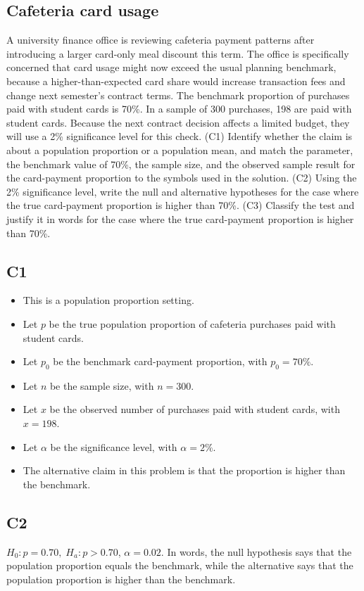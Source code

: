 \begin{ExamProblems}
		\section{Cafeteria card usage}
		A university finance office is reviewing cafeteria payment patterns after introducing a larger card-only meal discount this term. The office is specifically concerned that card usage might now exceed the usual planning benchmark, because a higher-than-expected card share would increase transaction fees and change next semester's contract terms. The benchmark proportion of purchases paid with student cards is 70\%. In a sample of 300 purchases, 198 are paid with student cards. Because the next contract decision affects a limited budget, they will use a 2\% significance level for this check. (C1) Identify whether the claim is about a population proportion or a population mean, and match the parameter, the benchmark value of 70\%, the sample size, and the observed sample result for the card-payment proportion to the symbols used in the solution. (C2) Using the 2\% significance level, write the null and alternative hypotheses for the case where the true card-payment proportion is higher than 70\%. (C3) Classify the test and justify it in words for the case where the true card-payment proportion is higher than 70\%.
		
		\subsection*{C1}
		\begin{itemize}
			\item This is a population proportion setting.
			\item Let \(p\) be the true population proportion of cafeteria purchases paid with student cards.
			\item Let \(p_0\) be the benchmark card-payment proportion, with \(p_0=70\%\).
			\item Let \(n\) be the sample size, with \(n=300\).
			\item Let \(x\) be the observed number of purchases paid with student cards, with \(x=198\).
			\item Let \(\alpha\) be the significance level, with \(\alpha=2\%\).
			\item The alternative claim in this problem is that the proportion is higher than the benchmark.
		\end{itemize}
		
		\subsection*{C2}
		\(H_0\colon p=0.70,\; H_a\colon p>0.70\), \(\alpha=0.02\). In words, the null hypothesis says that the population proportion equals the benchmark, while the alternative says that the population proportion is higher than the benchmark.
		

\end{ExamProblems}
